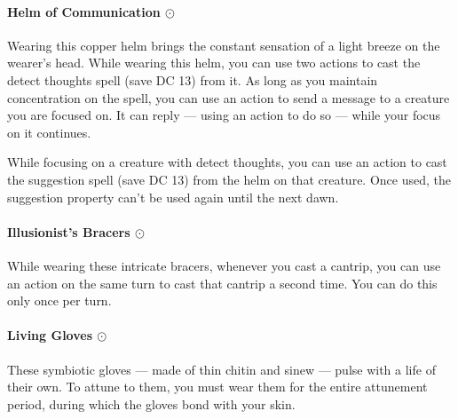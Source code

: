     \paragraph{Helm of Communication $\odot$}
        Wearing this copper helm brings the constant sensation of a light breeze on the wearer's head.
        While wearing this helm, you can use two actions to cast the detect thoughts spell (save DC 13) from it.
        As long as you maintain concentration on the spell, you can use an action to send a message to a creature you are focused on.
        It can reply --- using an action to do so --- while your focus on it continues.

        While focusing on a creature with detect thoughts, you can use an action to cast the suggestion spell (save DC 13) from the helm on that creature.
        Once used, the suggestion property can't be used again until the next dawn.
    \paragraph{Illusionist's Bracers $\odot$}
        While wearing these intricate bracers, whenever you cast a cantrip, you can use an action on the same turn to cast that cantrip a second time.
        You can do this only once per turn.
    \paragraph{Living Gloves $\odot$}
        These symbiotic gloves --- made of thin chitin and sinew --- pulse with a life of their own.
        To attune to them, you must wear them for the entire attunement period, during which the gloves bond with your skin.

